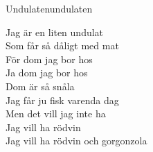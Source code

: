 \begin{song}{Undulaten}{undulaten}

\begin{vers}
Jag är en liten undulat\\
Som får så dåligt med mat\\
För dom jag bor hos\\
Ja dom jag bor hos\\
Dom är så snåla\\
Jag får ju fisk varenda dag\\
Men det vill jag inte ha\\
Jag vill ha rödvin\\
Jag vill ha rödvin och gorgonzola\\
\end{vers}
\end{song}
